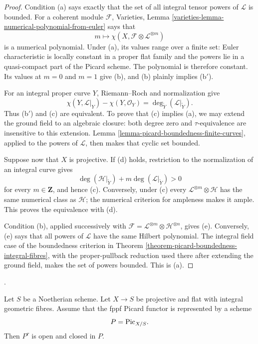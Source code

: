 \begin{proof}
Condition (a) says exactly that the set of all integral tensor powers of
$\mathcal{L}$ is bounded. For a coherent module $\mathcal{F}$, Varieties,
Lemma \ref{varieties-lemma-numerical-polynomial-from-euler} says that
$$
m \longmapsto
\chi(X,\mathcal{F} \otimes \mathcal{L}^{\otimes m})
$$
is a numerical polynomial. Under (a), its values range over a finite set:
Euler characteristic is locally constant in a proper flat family and the
powers lie in a quasi-compact part of the Picard scheme. The polynomial is
therefore constant. Its values at $m = 0$ and $m = 1$ give (b), and (b) plainly
implies (b$'$).

For an integral proper curve $Y$, Riemann--Roch and normalization give
$$
\chi(Y,\mathcal{L}|_Y) - \chi(Y,\mathcal{O}_Y)
= \deg_{\widetilde Y}(\mathcal{L}|_{\widetilde Y}).
$$
Thus (b$'$) and (c) are equivalent. To prove that (c) implies (a), we may
extend the ground field to an algebraic closure: both degree zero and
$\tau$-equivalence are insensitive to this extension. Lemma
\ref{lemma-picard-boundedness-finite-curves}, applied to the powers of
$\mathcal{L}$, then makes that cyclic set bounded.

Suppose now that $X$ is projective. If (d) holds, restriction to the
normalization of an integral curve gives
$$
\deg(\mathcal{H}|_{\widetilde Y})
+ m\deg(\mathcal{L}|_{\widetilde Y}) > 0
$$
for every $m \in \mathbf{Z}$, and hence (c). Conversely, under (c) every
$\mathcal{L}^{\otimes m} \otimes \mathcal{H}$ has the same numerical class as
$\mathcal{H}$; the numerical criterion for ampleness makes it ample. This
proves the equivalence with (d).

Condition (b), applied successively with
$\mathcal{F} = \mathcal{L}^{\otimes m} \otimes \mathcal{H}^{\otimes n}$, gives
(e). Conversely, (e) says that all powers of $\mathcal{L}$ have the same
Hilbert polynomial. The integral field case of the boundedness criterion in
Theorem \ref{theorem-picard-boundedness-integral-fibres}, with the
proper-pullback reduction used there after extending the ground field, makes
the set of powers bounded. This is (a).
\end{proof}

\begin{theorem}
\label{theorem-picard-tau-open-closed-integral}
\begin{reference}
\cite[Supplement to Expos\'e 236, (ix), p. 306]{FGA}.
\end{reference}
Let $S$ be a Noetherian scheme. Let $X \to S$ be projective and flat with
integral geometric fibres. Assume that the fppf Picard functor is represented
by a scheme
$$
P = \mathrm{Pic}_{X/S}.
$$
Then $P^\tau$ is open and closed in $P$.
\end{theorem}

